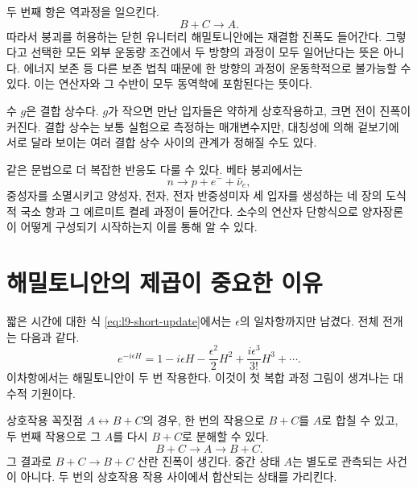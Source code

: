 두 번째 항은 역과정을 일으킨다.
\begin{equation}
B+C\longrightarrow A.
\end{equation}
따라서 붕괴를 허용하는 닫힌 유니터리 해밀토니안에는 재결합 진폭도 들어간다. 그렇다고 선택한 모든 외부 운동량 조건에서 두 방향의 과정이 모두 일어난다는 뜻은 아니다. 에너지 보존 등 다른 보존 법칙 때문에 한 방향의 과정이 운동학적으로 불가능할 수 있다. 이는 연산자와 그 수반이 모두 동역학에 포함된다는 뜻이다.

\begin{classroomqa}\end{classroomqa}

수 \(g\)은 결합 상수다. \(g\)가 작으면 만난 입자들은 약하게 상호작용하고, 크면 전이 진폭이 커진다. 결합 상수는 보통 실험으로 측정하는 매개변수지만, 대칭성에 의해 겉보기에 서로 달라 보이는 여러 결합 상수 사이의 관계가 정해질 수도 있다.

같은 문법으로 더 복잡한 반응도 다룰 수 있다. 베타 붕괴에서는
\begin{equation}
n\longrightarrow p+e^-+\bar\nu_e,
\end{equation}
중성자를 소멸시키고 양성자, 전자, 전자 반중성미자 세 입자를 생성하는 네 장의 도식적 국소 항과 그 에르미트 켤레 과정이 들어간다. 소수의 연산자 단항식으로 양자장론이 어떻게 구성되기 시작하는지 이를 통해 알 수 있다.

\section{해밀토니안의 제곱이 중요한 이유}

짧은 시간에 대한 식 \eqref{eq:l9-short-update}에서는 \(\epsilon\)의 일차항까지만 남겼다. 전체 전개는 다음과 같다.
\begin{equation}
e^{-i\epsilon H}
=1-i\epsilon H-\frac{\epsilon^2}{2}H^2
+\frac{i\epsilon^3}{3!}H^3+\cdots.
\label{eq:l9-exponential}
\end{equation}
이차항에서는 해밀토니안이 두 번 작용한다. 이것이 첫 복합 과정 그림이 생겨나는 대수적 기원이다.

상호작용 꼭짓점 \(A\leftrightarrow B+C\)의 경우, 한 번의 작용으로 \(B+C\)를 \(A\)로 합칠 수 있고, 두 번째 작용으로 그 \(A\)를 다시 \(B+C\)로 분해할 수 있다.
\begin{equation}
B+C\longrightarrow A\longrightarrow B+C.
\label{eq:l9-bc-scattering}
\end{equation}
그 결과로 \(B+C\to B+C\) 산란 진폭이 생긴다. 중간 상태 \(A\)는 별도로 관측되는 사건이 아니다. 두 번의 상호작용 작용 사이에서 합산되는 상태를 가리킨다.

